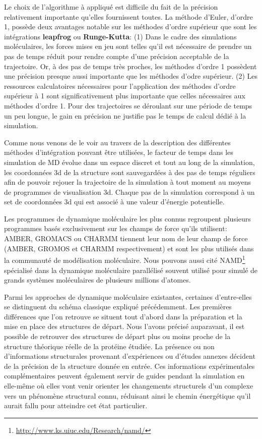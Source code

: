 Le choix de l'algorithme à appliqué est difficile du fait de la précision relativement importante qu'elles fournissent toutes. La méthode d'Euler, d'ordre 1, possède deux avantages notable sur les méthodes d'ordre supérieur que sont les intégrations \textbf{leapfrog} ou \textbf{Runge-Kutta}: (1) Dans le cadre des simulations moléculaires, les forces mises en jeu sont telles qu'il est nécessaire de prendre un pas de temps réduit pour rendre compte d'une précision acceptable de la trajectoire. Or, à des pas de temps très proches, les méthodes d'ordre 1 possèdent une précision presque aussi importante que les méthodes d'odre supérieur. (2) Les ressources calculatoires nécessaires pour l'application des méthodes d'ordre supérieur à 1 sont significativement plus importante que celles nécessaires aux méthodes d'ordre 1. Pour des trajectoires se déroulant sur une période de temps un peu longue, le gain en précision ne justifie pas le temps de calcul dédié à la simulation.  

Comme nous venons de le voir au travers de la description des différentes méthodes d'intégration pouvant être utilisées, le facteur de temps dans les simulation de MD évolue dans un espace discret et tout au long de la simulation, les coordonnées 3d de la structure sont sauvegardées à des pas de temps réguliers afin de pouvoir rejouer la trajectoire de la simulation à tout moment au moyens de programmes de visualisation 3d. Chaque pas de la simulation correspond à un set de coordonnées 3d qui est associé à une valeur d'énergie potentielle.

Les programmes de dynamique moléculaire les plus connus regroupent plusieurs programmes basés exclusivement sur les champs de force qu'ils utilisent: AMBER, GROMACS ou CHARMM tiennent leur nom de leur champ de force (AMBER, GROMOS et CHARMM respectivement) et sont les plus utilisés dans la communauté de modélisation moléculaire. Nous pouvons aussi cité NAMD\footnote{\url{http://www.ks.uiuc.edu/Research/namd/}} \cite{phillips2005scalable} spécialisé dans la dynamique moléculaire parallélisé souvent utilisé pour simulé de grands systèmes moléculaires de plusieurs millions d'atomes.

Parmi les approches de dynamique moléculaire existantes, certaines d'entre-elles se distinguent du schéma classique expliqué précédemment.
Les premières différences que l'on retrouve se situent tout d'abord dans la préparation et la mise en place des structures de départ. Nous l'avons précisé auparavant, il est possible de retrouver des structures de départ plus ou moins proche de la structure théorique réelle de la protéine étudiée. La présence ou non d'informations structurales provenant d'expériences ou d'études annexes décident de la précision de la structure donnée en entrée.
Ces informations expérimentales complémentaires peuvent également servir de guides pendant la simulation en elle-même où elles vont venir orienter les changements structurels d'un complexe vers un phénomène structural connu, réduisant ainsi le chemin énergétique qu'il aurait fallu pour atteindre cet état particulier.

